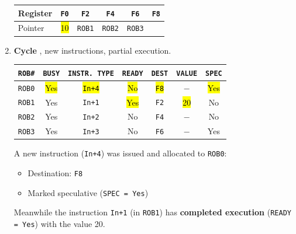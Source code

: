 \begin{examplebox}
\begin{enumerate}
        \begin{center}
            \begin{tabular}{@{} l | c c c c c @{}}
                \toprule
                Register    & \texttt{F0}   & \texttt{F2}   & \texttt{F4}           & \texttt{F6}           & \texttt{F8} \\
                \midrule
                Pointer     & \hl{10}       & \texttt{ROB1} & \texttt{ROB2}         & \texttt{ROB3}         &             \\
                \bottomrule
            \end{tabular}
        \end{center}


        \item \textbf{Cycle \theenumi}, new instructions, partial execution.
        \begin{center}
            \begin{tabular}{@{} c | c | c | c | c | c | c @{}}
                \toprule
                \texttt{ROB\#} & \texttt{BUSY} & \texttt{INSTR. TYPE} & \texttt{READY} & \texttt{DEST} & \texttt{VALUE} & \texttt{SPEC} \\
                \midrule
                \texttt{ROB0} & \hl{Yes}    & \hl{\texttt{In+4}}    & \hl{No}   & \hl{\texttt{F8}}  & $-$       & \hl{Yes}      \\ [.3em]
                \texttt{ROB1} & Yes         & \texttt{In+1}         & \hl{Yes}  & \texttt{F2}       & \hl{20}   & No            \\ [.3em]
                \texttt{ROB2} & Yes         & \texttt{In+2}         & No        & \texttt{F4}       & $-$       & No            \\ [.3em]
                \texttt{ROB3} & Yes         & \texttt{In+3}         & No        & \texttt{F6}       & $-$       & Yes           \\
                \bottomrule
            \end{tabular}
        \end{center}
        A new instruction (\texttt{In+4}) was issued and allocated to \texttt{ROB0}:
        \begin{itemize}
            \item Destination: \texttt{F8}
            \item Marked speculative (\texttt{SPEC = Yes})
        \end{itemize}
        Meanwhile the instruction \texttt{In+1} (in \texttt{ROB1}) has \textbf{completed execution} (\texttt{READY = Yes}) with the value 20.

\end{enumerate}
\end{examplebox}
